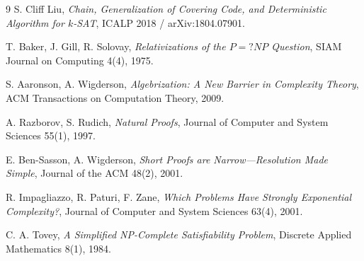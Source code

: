 \documentclass[11pt]{article}
\theoremstyle{plain}
\theoremstyle{definition}
\theoremstyle{remark}
\begin{document}
\begin{thebibliography}{9}
S. Cliff Liu,
\emph{Chain, Generalization of Covering Code, and Deterministic Algorithm for $k$-SAT},
ICALP 2018 / arXiv:1804.07901.

T. Baker, J. Gill, R. Solovay,
\emph{Relativizations of the $P=?NP$ Question},
SIAM Journal on Computing 4(4), 1975.

S. Aaronson, A. Wigderson,
\emph{Algebrization: A New Barrier in Complexity Theory},
ACM Transactions on Computation Theory, 2009.

A. Razborov, S. Rudich,
\emph{Natural Proofs},
Journal of Computer and System Sciences 55(1), 1997.

E. Ben-Sasson, A. Wigderson,
\emph{Short Proofs are Narrow---Resolution Made Simple},
Journal of the ACM 48(2), 2001.

R. Impagliazzo, R. Paturi, F. Zane,
\emph{Which Problems Have Strongly Exponential Complexity?},
Journal of Computer and System Sciences 63(4), 2001.

C. A. Tovey,
\emph{A Simplified NP-Complete Satisfiability Problem},
Discrete Applied Mathematics 8(1), 1984.
\end{thebibliography}
\end{document}
